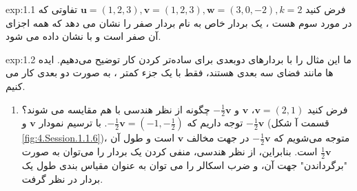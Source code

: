 {\begin{spacing}{1.5}
        \textbf{\vspace{-10pt}}
        \begin{example}{exp:1.1}
            \Large
            فرض کنید $\textbf{u}=(1,2,3), \textbf{v}=(1,2,3), \textbf{w}=(3,0,-2), k=2$
            تفاوتی که در مورد سوم هست ، یک بردار خاص به نام بردار صفر را نشان می دهد که همه اجزای آن صفر است و با  نشان داده می شود.
        \end{example}

        \textbf{\vspace{-20pt}}
        \begin{example}{exp:1.2}
            \Large
            ما این مثال را با بردارهای دوبعدی برای ساده‌تر کردن کار توضیح می‌دهیم. ایده ها مانند فضای سه بعدی هستند، فقط با یک جزء کمتر ، به صورت دو بعدی کار می کنیم.\\
            \begin{enumerate}[label=\textbf{\arabic*}.]
                \item {فرض کنید $\textbf{v}=(2,1)$، $\textbf{v}$ و $-\frac{\displaystyle 1}{\displaystyle 2}\textbf{v}$ چگونه از نظر هندسی با هم مقایسه می شوند؟
                توجه داریم که $-\frac{\displaystyle 1}{\displaystyle 2}\textbf{v}=(-1,-\frac{\displaystyle 1}{\displaystyle 2})$.
                با ترسیم نمودار $\textbf{v}$ و $-\frac{\displaystyle 1}{\displaystyle 2}\textbf{v}$ (قسمت آ شکل \ref{fig:4.Session.1.1.6})،
                متوجه می‌شویم که $-\frac{\displaystyle 1}{\displaystyle 2}\textbf{v}$ در جهت مخالف $\textbf{v}$ است و طول آن $\frac{\displaystyle 1}{\displaystyle 2}\textbf{v}$ است.
                بنابراین، از نظر هندسی، منفی کردن یک بردار را می‌توان به صورت "برگرداندن" جهت آن،
                و ضرب اسکالر را می توان به عنوان مقیاس بندی طول یک بردار در نظر گرفت.}\\


\end{enumerate}
\end{example}
\end{spacing}}
